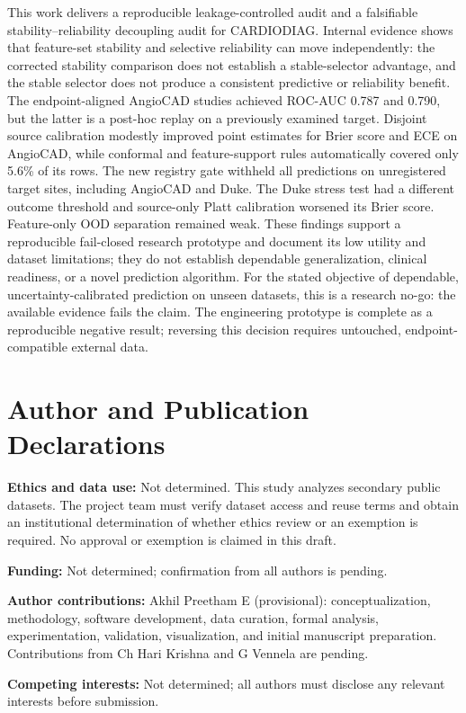 \documentclass[journal]{IEEEtran}
\begin{document}
This work delivers a reproducible leakage-controlled audit and a falsifiable
stability--reliability decoupling audit for CARDIODIAG. Internal evidence shows
that feature-set stability and selective reliability can move independently:
the corrected stability comparison does not establish a stable-selector
advantage, and the stable selector does not produce a consistent predictive or
reliability benefit.
The endpoint-aligned AngioCAD studies achieved ROC-AUC 0.787 and 0.790, but
the latter is a post-hoc replay on a previously examined target. Disjoint
source calibration modestly improved point estimates for Brier score and ECE
on AngioCAD, while conformal and feature-support rules automatically covered
only 5.6\% of its rows. The new registry gate withheld all predictions on
unregistered target sites, including AngioCAD and Duke. The Duke stress test
had a different outcome threshold and source-only Platt calibration worsened
its Brier score. Feature-only OOD separation remained weak. These findings
support a reproducible fail-closed research prototype and document its low
utility and dataset limitations; they do not establish dependable
generalization, clinical readiness, or a novel prediction algorithm.
For the stated objective of dependable, uncertainty-calibrated prediction on
unseen datasets, this is a research no-go: the available evidence fails the
claim. The engineering prototype is complete as a reproducible negative result;
reversing this decision requires untouched, endpoint-compatible external data.

\section*{Author and Publication Declarations}
\textbf{Ethics and data use:} Not determined. This study analyzes secondary
public datasets. The project team must verify dataset access and reuse terms
and obtain an institutional determination of whether ethics review or an
exemption is required. No approval or exemption is claimed in this draft.

\textbf{Funding:} Not determined; confirmation from all authors is pending.

\textbf{Author contributions:} Akhil Preetham E (provisional):
conceptualization, methodology, software development, data curation, formal
analysis, experimentation, validation, visualization, and initial manuscript
preparation. Contributions from Ch Hari Krishna and G Vennela are pending.

\textbf{Competing interests:} Not determined; all authors must disclose any
relevant interests before submission.
\end{document}
